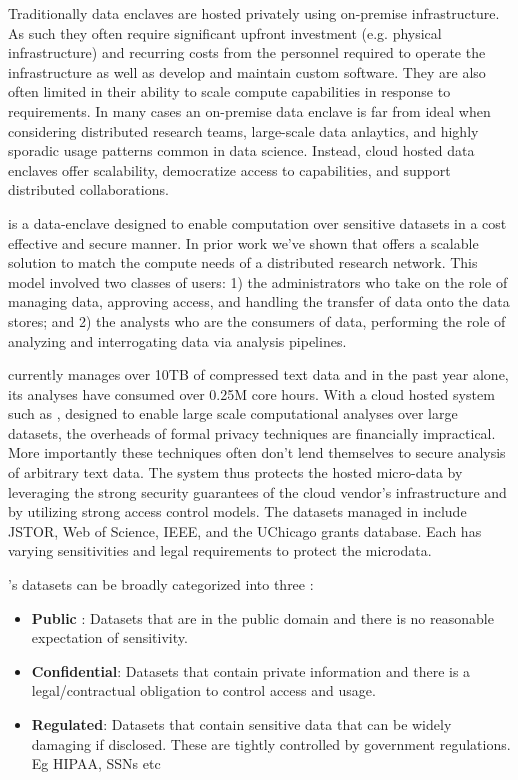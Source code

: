 Traditionally data enclaves are hosted privately using on-premise infrastructure. As
such they often require significant upfront investment (e.g. physical infrastructure) and recurring costs 
from the personnel required to operate the infrastructure as well as develop and maintain custom software. 
They are also often limited in their ability to scale
compute capabilities in response to requirements. In many cases an on-premise data enclave is far from ideal
when considering distributed research teams, large-scale data anlaytics, and highly sporadic
usage patterns common in data science. Instead, cloud hosted data enclaves offer scalability,
democratize access to capabilities, and support distributed collaborations. 

\NAME is a data-enclave designed to enable computation over sensitive datasets
in a cost effective and secure manner. In prior work we've shown that \NAME offers
a scalable solution to match the compute needs of a distributed research network.
This model involved two classes of users: 1) the administrators who take on the role of managing
data, approving access, and handling the transfer of data onto the data stores; and 2) the analysts
who are the consumers of data, performing the role of analyzing and interrogating data
via analysis pipelines.

\NAME currently manages over 10TB of compressed text data and in the past year
alone, its analyses have consumed over 0.25M core hours. With a cloud hosted system
such as \NAMENS, designed to enable large scale computational analyses over large datasets,
the overheads of formal privacy techniques are financially impractical. More importantly
these techniques often don't lend themselves to secure analysis of arbitrary text data. 
The system thus protects the hosted micro-data by leveraging the strong security
guarantees of the cloud vendor's infrastructure and by utilizing strong access control
models. The datasets managed in \NAME include JSTOR, Web of Science, IEEE,
and the UChicago grants database. Each has varying sensitivities and legal requirements to
protect the microdata.

\NAMENS's datasets can be broadly categorized into three \cite{ist_dataclass}:
\begin{itemize}
\item \textbf{Public} : Datasets that are in the public domain and there is no
  reasonable expectation of sensitivity.
\item \textbf{Confidential}: Datasets that contain private information and there is a legal/contractual obligation to control access and usage.
\item \textbf {Regulated}: Datasets that contain sensitive data that can be widely damaging if disclosed.
  These are tightly controlled by government regulations. Eg HIPAA, SSNs etc
\end{itemize}


